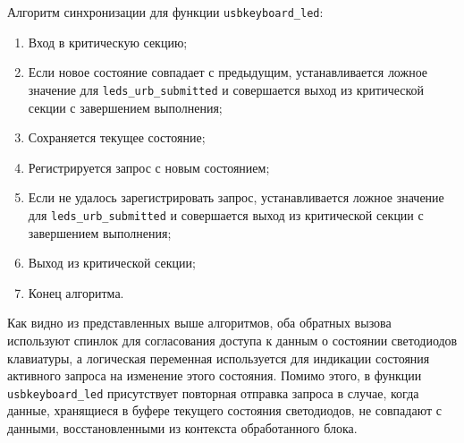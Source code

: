 Алгоритм синхронизации для функции \texttt{usbkeyboard\_led}:
\begin{enumerate}
    \item Вход в критическую секцию;
    \item Если новое состояние совпадает с предыдущим,
          устанавливается ложное значение для
          \texttt{leds\_urb\_submitted} и совершается
          выход из критической секции с завершением выполнения;
    \item Сохраняется текущее состояние;
    \item Регистрируется запрос с новым состоянием;
    \item Если не удалось зарегистрировать запрос,
          устанавливается ложное значение для
          \texttt{leds\_urb\_submitted} и совершается  
          выход из критической секции с завершением выполнения;
    \item Выход из критической секции;
    \item Конец алгоритма.
\end{enumerate}

Как видно из представленных выше алгоритмов, оба обратных вызова
используют спинлок для согласования доступа к данным о состоянии
светодиодов клавиатуры, а логическая переменная используется для
индикации состояния активного запроса на изменение этого состояния.
Помимо этого, в функции \texttt{usbkeyboard\_led} присутствует
повторная отправка запроса в случае, когда данные, хранящиеся в буфере
текущего состояния светодиодов, не совпадают с данными, восстановленными
из контекста обработанного блока.